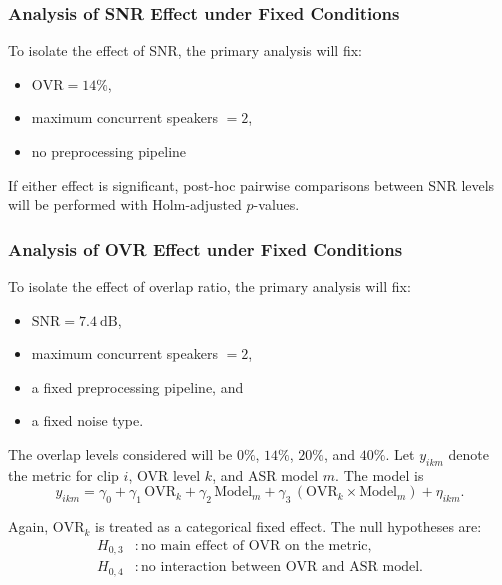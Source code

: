 \subsubsection{Analysis of SNR Effect under Fixed Conditions}

To isolate the effect of SNR, the primary analysis will fix:
\begin{itemize}
    \item \(\mathrm{OVR} = 14\%\),
    \item maximum concurrent speakers \(= 2\),
    \item no preprocessing pipeline
\end{itemize}

If either effect is significant, post-hoc pairwise comparisons between SNR levels will be performed with Holm-adjusted \(p\)-values.

\subsubsection{Analysis of OVR Effect under Fixed Conditions}

To isolate the effect of overlap ratio, the primary analysis will fix:
\begin{itemize}
    \item \(\mathrm{SNR} = 7.4\ \mathrm{dB}\),
    \item maximum concurrent speakers \(= 2\),
    \item a fixed preprocessing pipeline, and
    \item a fixed noise type.
\end{itemize}

The overlap levels considered will be \(0\%\), \(14\%\), \(20\%\), and \(40\%\). Let \(y_{ikm}\) denote the metric for clip \(i\), OVR level \(k\), and ASR model \(m\). The model is
\begin{equation}
    y_{ikm}
    =
    \gamma_0
    +
    \gamma_1 \,\mathrm{OVR}_k
    +
    \gamma_2 \,\mathrm{Model}_m
    +
    \gamma_3 \,(\mathrm{OVR}_k \times \mathrm{Model}_m)
    +
    \eta_{ikm}.
\end{equation}

Again, \(\mathrm{OVR}_k\) is treated as a categorical fixed effect. The null hypotheses are:
\begin{align}
    H_{0,3} &: \text{no main effect of OVR on the metric}, \\
    H_{0,4} &: \text{no interaction between OVR and ASR model}.
\end{align}

